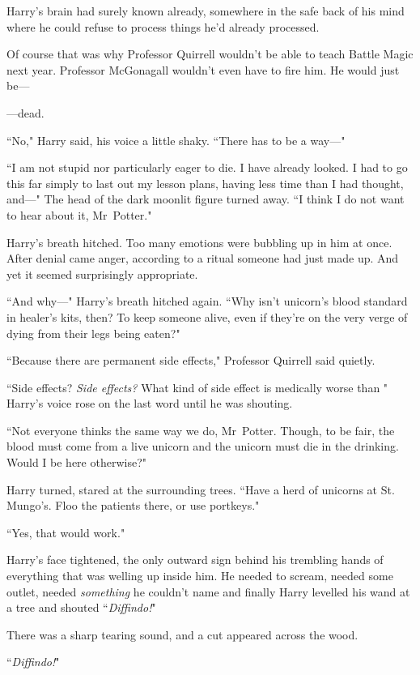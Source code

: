 Harry's brain had surely known already, somewhere in the safe back of his mind where he could refuse to process things he'd already processed.

Of course that was why Professor Quirrell wouldn't be able to teach Battle Magic next year. Professor McGonagall wouldn't even have to fire him. He would just be—

—dead.

``No," Harry said, his voice a little shaky. ``There has to be a way—"

``I am not stupid nor particularly eager to die. I have already looked. I had to go this far simply to last out my lesson plans, having less time than I had thought, and—" The head of the dark moonlit figure turned away. ``I think I do not want to hear about it, Mr~Potter."

Harry's breath hitched. Too many emotions were bubbling up in him at once. After denial came anger, according to a ritual someone had just made up. And yet it seemed surprisingly appropriate.

``And why—" Harry's breath hitched again. ``Why isn't unicorn's blood standard in healer's kits, then? To keep someone alive, even if they're on the very verge of dying from their legs being eaten?"

``Because there are permanent side effects," Professor Quirrell said quietly.

``Side effects? \emph{Side effects?} What kind of side effect is medically worse than " Harry's voice rose on the last word until he was shouting.

``Not everyone thinks the same way we do, Mr~Potter. Though, to be fair, the blood must come from a live unicorn and the unicorn must die in the drinking. Would I be here otherwise?"

Harry turned, stared at the surrounding trees. ``Have a herd of unicorns at St. Mungo's. Floo the patients there, or use portkeys."

``Yes, that would work."

Harry's face tightened, the only outward sign behind his trembling hands of everything that was welling up inside him. He needed to scream, needed some outlet, needed \emph{something} he couldn't name and finally Harry levelled his wand at a tree and shouted ``\emph{Diffindo!}"

There was a sharp tearing sound, and a cut appeared across the wood.

``\emph{Diffindo!}"

